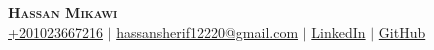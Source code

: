 \documentclass[letterpaper,10.5pt]{article}
\makeatletter
\newcommand{\resumeEducationHeading}[6]{
  \vspace{-2pt}\item
    \begin{tabular*}{0.97\textwidth}[t]{l@{\extracolsep{\fill}}r}
      \textbf{#1} & #2 \\
      \textit{\small#3} & \textit{\small #4} \\
      \textit{\small#5} & \textit{\small #6} \\
    \end{tabular*}\vspace{-5pt}
}
\newcommand{\resumeSubHeadingListStart}{\begin{itemize}[leftmargin=0.15in, label={}]}
\newcommand{\resumeSubHeadingListEnd}{\end{itemize}}
\makeatother
\begin{document}

\begin{center}
    \textbf{\Huge \scshape Hassan Mikawi} \\ \vspace{5pt}
    \small
    \hspace{.5pt} \href{tel:+201023667216}{+201023667216}
    $|$
    \hspace{.5pt} \href{mailto:hassansherif12220@gmail.com}{hassansherif12220@gmail.com}
    $|$
    \hspace{.5pt} \href{https://www.linkedin.com/in/mikawi/}{LinkedIn}
    $|$
    \hspace{.5pt} \href{https://github.com/Hassan220022}{GitHub}
\end{center}









  
\end{document}

